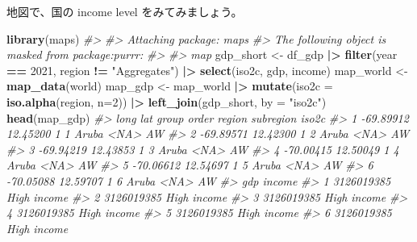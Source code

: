 \documentclass[
  xelatex, ja=standard]{bxjsbook}
\newenvironment{Shaded}{\begin{snugshade}}{\end{snugshade}}
\newcommand{\AttributeTok}[1]{\textcolor[rgb]{0.13,0.29,0.53}{#1}}
\newcommand{\CommentTok}[1]{\textcolor[rgb]{0.56,0.35,0.01}{\textit{#1}}}
\newcommand{\DecValTok}[1]{\textcolor[rgb]{0.00,0.00,0.81}{#1}}
\newcommand{\FunctionTok}[1]{\textcolor[rgb]{0.13,0.29,0.53}{\textbf{#1}}}
\newcommand{\NormalTok}[1]{#1}
\newcommand{\OtherTok}[1]{\textcolor[rgb]{0.56,0.35,0.01}{#1}}
\newcommand{\SpecialCharTok}[1]{\textcolor[rgb]{0.81,0.36,0.00}{\textbf{#1}}}
\newcommand{\StringTok}[1]{\textcolor[rgb]{0.31,0.60,0.02}{#1}}
\theoremstyle{definition}
\theoremstyle{definition}
\theoremstyle{definition}
\theoremstyle{definition}
\theoremstyle{remark}
\begin{document}
地図で、国の income level をみてみましょう。

\begin{Shaded}
\begin{Highlighting}[]
\FunctionTok{library}\NormalTok{(maps)}
\CommentTok{\#\textgreater{} }
\CommentTok{\#\textgreater{} Attaching package: \textquotesingle{}maps\textquotesingle{}}
\CommentTok{\#\textgreater{} The following object is masked from \textquotesingle{}package:purrr\textquotesingle{}:}
\CommentTok{\#\textgreater{} }
\CommentTok{\#\textgreater{}     map}
\NormalTok{gdp\_short }\OtherTok{\textless{}{-}}\NormalTok{ df\_gdp }\SpecialCharTok{|\textgreater{}} \FunctionTok{filter}\NormalTok{(year }\SpecialCharTok{==} \DecValTok{2021}\NormalTok{, region }\SpecialCharTok{!=} \StringTok{"Aggregates"}\NormalTok{) }\SpecialCharTok{|\textgreater{}}
  \FunctionTok{select}\NormalTok{(iso2c, gdp, income)}
\NormalTok{map\_world }\OtherTok{\textless{}{-}} \FunctionTok{map\_data}\NormalTok{(}\StringTok{\textquotesingle{}world\textquotesingle{}}\NormalTok{)}
\NormalTok{map\_gdp }\OtherTok{\textless{}{-}}\NormalTok{ map\_world }\SpecialCharTok{|\textgreater{}} 
  \FunctionTok{mutate}\NormalTok{(}\AttributeTok{iso2c =} \FunctionTok{iso.alpha}\NormalTok{(region, }\AttributeTok{n=}\DecValTok{2}\NormalTok{)) }\SpecialCharTok{|\textgreater{}} 
  \FunctionTok{left\_join}\NormalTok{(gdp\_short, }\AttributeTok{by =} \StringTok{"iso2c"}\NormalTok{) }
\FunctionTok{head}\NormalTok{(map\_gdp)}
\CommentTok{\#\textgreater{}        long      lat group order region subregion iso2c}
\CommentTok{\#\textgreater{} 1 {-}69.89912 12.45200     1     1  Aruba      \textless{}NA\textgreater{}    AW}
\CommentTok{\#\textgreater{} 2 {-}69.89571 12.42300     1     2  Aruba      \textless{}NA\textgreater{}    AW}
\CommentTok{\#\textgreater{} 3 {-}69.94219 12.43853     1     3  Aruba      \textless{}NA\textgreater{}    AW}
\CommentTok{\#\textgreater{} 4 {-}70.00415 12.50049     1     4  Aruba      \textless{}NA\textgreater{}    AW}
\CommentTok{\#\textgreater{} 5 {-}70.06612 12.54697     1     5  Aruba      \textless{}NA\textgreater{}    AW}
\CommentTok{\#\textgreater{} 6 {-}70.05088 12.59707     1     6  Aruba      \textless{}NA\textgreater{}    AW}
\CommentTok{\#\textgreater{}          gdp      income}
\CommentTok{\#\textgreater{} 1 3126019385 High income}
\CommentTok{\#\textgreater{} 2 3126019385 High income}
\CommentTok{\#\textgreater{} 3 3126019385 High income}
\CommentTok{\#\textgreater{} 4 3126019385 High income}
\CommentTok{\#\textgreater{} 5 3126019385 High income}
\CommentTok{\#\textgreater{} 6 3126019385 High income}
\end{Highlighting}
\end{Shaded}
\end{document}
